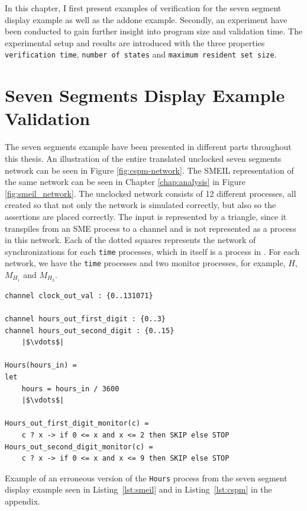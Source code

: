 
In this chapter, I first present examples of verification for the seven segment display example as well as the addone example. Secondly, an experiment have been conducted to gain further insight into program size and validation time. The experimental setup and results are introduced with the three properties \texttt{verification time}, \texttt{number of states} and \texttt{maximum resident set size}.

\section{Seven Segments Display Example Validation}
The seven segments example have been presented in different parts throughout this thesis. An illustration of the entire translated unclocked seven segments network can be seen in Figure \ref{fig:cspm-network}. The SMEIL representation of the same network can be seen in Chapter \ref{chap:analysis} in Figure \ref{fig:smeil_network}.
The unclocked \cspm{} network consists of 12 different processes, all created so that not only the network is simulated correctly, but also so the assertions are placed correctly. The input is represented by a triangle, since it transpiles from an SME process to a \cspm{} channel and is not represented as a process in this network. Each of the dotted squares represents the network of synchronizations for each \texttt{time} processes, which in itself is a process in \cspm{}. For each network, we have the \texttt{time} processes and two monitor processes, for example, $H$, $M_{H_1}$ and $M_{H_2}$.
\\

\begin{listing}
\begin{verbatim}
channel clock_out_val : {0..131071}

channel hours_out_first_digit : {0..3}
channel hours_out_second_digit : {0..15}
    |$\vdots$|

Hours(hours_in) =
let
    hours = hours_in / 3600
    |$\vdots$|

Hours_out_first_digit_monitor(c) =
    c ? x -> if 0 <= x and x <= 2 then SKIP else STOP
Hours_out_second_digit_monitor(c) =
    c ? x -> if 0 <= x and x <= 9 then SKIP else STOP

\end{verbatim}
\caption{Example of an erroneous version of the \texttt{Hours} process from the \cspm{} seven segment display example seen in Listing~\ref{lst:smeil} and in Listing~\ref{lst:cspm} in the appendix.}
\label{lst:cspm_error}
\end{listing}

